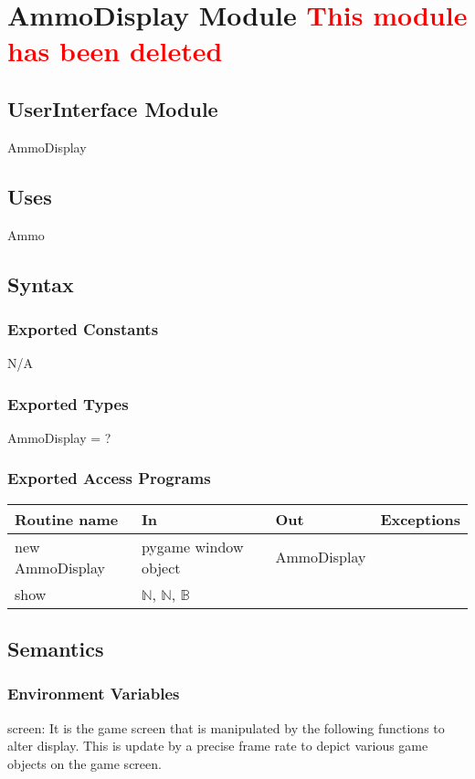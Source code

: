 \documentclass[12pt]{article}
\begin{document}
\section{AmmoDisplay Module \textcolor{red}{This module has been deleted}}

\subsection*{UserInterface Module}
AmmoDisplay

\subsection*{Uses}
Ammo

\subsection*{Syntax}
\subsubsection*{Exported Constants}
N/A
\subsubsection*{Exported Types}
AmmoDisplay = ?
\subsubsection*{Exported Access Programs}

\begin{tabular}{| l | l | l | l |}
\hline
\textbf{Routine name} & \textbf{In} & \textbf{Out} & \textbf{Exceptions}\\
\hline
new AmmoDisplay       &pygame window object&     AmmoDisplay        &           \\
\hline
show       &	 $\mathbb{N}$, $\mathbb{N}$, $\mathbb{B}$    &           &          \\
\hline
\end{tabular}

\subsection*{Semantics}
\subsubsection*{Environment Variables}
screen: It is the game screen that is manipulated by the following functions to alter display. This is update by a precise frame rate to depict various game objects on the game screen.
\end{document}
